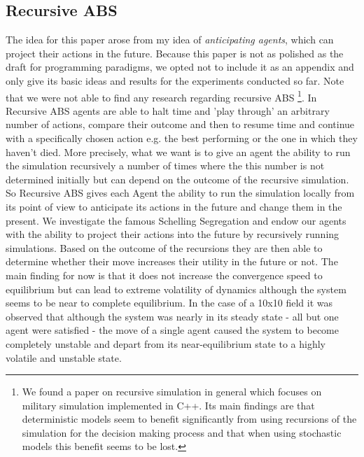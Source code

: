 \subsection{Recursive ABS}
The idea for this paper arose from my idea of \textit{anticipating agents}, which can project their actions in the future. Because this paper is not as polished as the draft for programming paradigms, we opted not to include it as an appendix and only give its basic ideas and results for the experiments conducted so far. Note that we were not able to find any research regarding recursive ABS \footnote{We found a paper on recursive simulation in general \cite{gilmer_recursive_2000} which focuses on military simulation implemented in C++. Its main findings are that deterministic models seem to benefit significantly from using recursions of the simulation for the decision making process and that when using stochastic models this benefit seems to be lost.}.
In Recursive ABS agents are able to halt time and 'play through' an arbitrary number of actions, compare their outcome and then to resume time and continue with a specifically chosen action e.g. the best performing or the one in which they haven't died. More precisely, what we want is to give an agent the ability to run the simulation recursively a number of times where the this number is not determined initially but can depend on the outcome of the recursive simulation. So Recursive ABS gives each Agent the ability to run the simulation locally from its point of view to anticipate its actions in the future and change them in the present.
We investigate the famous Schelling Segregation \cite{schelling_dynamic_1971} and endow our agents with the ability to project their actions into the future by recursively running simulations. Based on the outcome of the recursions they are then able to determine whether their move increases their utility in the future or not. The main finding for now is that it does not increase the convergence speed to equilibrium but can lead to extreme volatility of dynamics although the system seems to be near to complete equilibrium. In the case of a 10x10 field it was observed that although the system was nearly in its steady state - all but one agent were satisfied - the move of a single agent caused the system to become completely unstable and depart from its near-equilibrium state to a highly volatile and unstable state.

